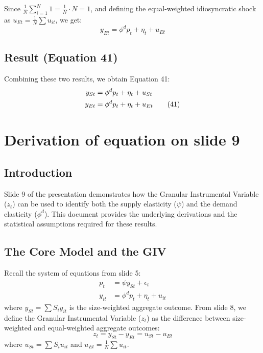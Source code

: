 \documentclass[12pt]{article}
\begin{document}
Since $\frac{1}{N} \sum_{i=1}^N 1 = \frac{1}{N} \cdot N = 1$, and defining the equal-weighted idiosyncratic shock as $u_{Et} = \frac{1}{N} \sum u_{it}$, we get:
\begin{equation}
    y_{Et} = \phi^d p_t + \eta_t + u_{Et}
\end{equation}

\subsection{Result (Equation 41)}
Combining these two results, we obtain Equation 41:
\begin{align}
    y_{St} & = \phi^d p_t + \eta_t + u_{St} \notag   \\
    y_{Et} & = \phi^d p_t + \eta_t + u_{Et} \tag{41}
\end{align}


\section{Derivation of equation on slide 9}
\subsection{Introduction}
Slide 9 of the presentation demonstrates how the Granular Instrumental Variable ($z_t$) can be used to identify both the supply elasticity ($\psi$) and the demand elasticity ($\phi^d$). This document provides the underlying derivations and the statistical assumptions required for these results.

\subsection{The Core Model and the GIV}
Recall the system of equations from slide 5:
\begin{align}
    p_t    & = \psi y_{St} + \epsilon_t \label{eq:supply} \tag{38}          \\
    y_{it} & = \phi^d p_t + \eta_t + u_{it} \label{eq:demand_firm} \tag{39}
\end{align}
where $y_{St} = \sum S_i y_{it}$ is the size-weighted aggregate outcome. From slide 8, we define the Granular Instrumental Variable ($z_t$) as the difference between size-weighted and equal-weighted aggregate outcomes:
\begin{equation}
    z_t = y_{St} - y_{Et} = u_{St} - u_{Et} \label{eq:giv_def} \tag{42}
\end{equation}
where $u_{St} = \sum S_i u_{it}$ and $u_{Et} = \frac{1}{N} \sum u_{it}$.
\end{document}
